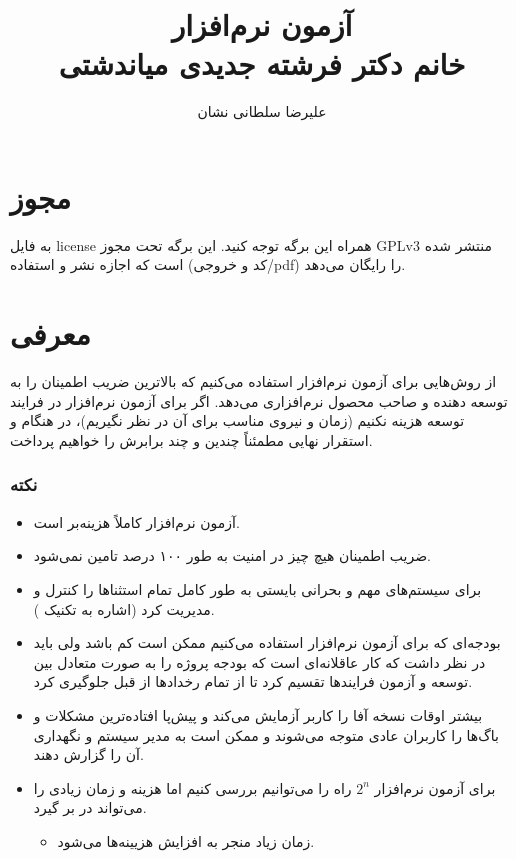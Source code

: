 \documentclass[a4paper]{article}
\title{آزمون نرم‌افزار \\ خانم دکتر فرشته جدیدی میاندشتی}
\author{علیرضا سلطانی نشان}
\begin{document}
\maketitle
\tableofcontents

\section*{مجوز}

به فایل license همراه این برگه توجه کنید. این برگه تحت مجوز GPLv3 منتشر شده است
که اجازه نشر و استفاده (کد و خروجی/pdf) را رایگان می‌دهد.

\section{معرفی}

از روش‌هایی برای آزمون نرم‌افزار استفاده می‌کنیم که بالاترین ضریب اطمینان را به
توسعه دهنده و صاحب محصول نرم‌افزاری می‌دهد. اگر برای آزمون نرم‌افزار در فرایند
توسعه هزینه نکنیم (زمان و نیروی مناسب برای آن در نظر نگیریم)، در هنگام
 و استقرار نهایی مطمئناً چندین و چند برابرش را خواهیم پرداخت.

\subsubsection*{نکته}

\begin{itemize}
    \item آزمون نرم‌افزار کاملاً هزینه‌بر است.
    \item ضریب اطمینان هیچ چیز در امنیت به طور ۱۰۰ درصد تامین نمی‌شود.
    \item برای سیستم‌های مهم و بحرانی بایستی به طور کامل تمام استثنا‌ها را کنترل
    و مدیریت کرد (اشاره به تکنیک ).
    \item بودجه‌ای که برای آزمون نرم‌افزار استفاده می‌کنیم ممکن است کم باشد ولی
    باید در نظر داشت که کار عاقلانه‌ای است که بودجه پروژه را به صورت متعادل بین
    توسعه و آزمون فرایند‌ها تقسیم کرد تا از تمام رخداد‌ها از قبل جلوگیری کرد.
    \item بیشتر اوقات نسخه آفا را کاربر آزمایش می‌کند و پیش‌پا افتاده‌ترین
    مشکلات و باگ‌ها را کاربران عادی متوجه می‌شوند و ممکن است به مدیر سیستم و
    نگهداری آن را گزارش دهند.
    \item برای آزمون نرم‌افزار $2^{n}$ راه را می‌توانیم بررسی کنیم اما هزینه و
    زمان زیادی را می‌تواند در بر گیرد.
    \begin{itemize}
        \item زمان زیاد منجر به افزایش هزیینه‌ها می‌شود.
    \end{itemize}
\end{itemize}
\end{document}
